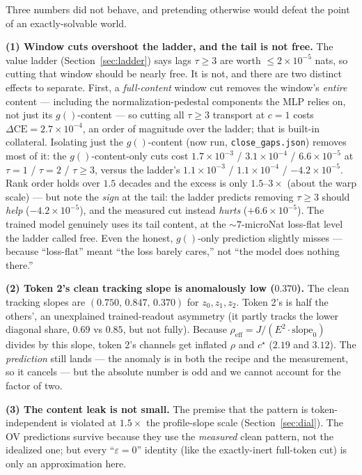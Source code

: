 \documentclass[11pt]{article}
\newcommand{\gv}[1]{g(#1)}
\newcommand{\ceword}{\mathrm{CE}}
\begin{document}
Three numbers did not behave, and pretending otherwise would defeat the point
of an exactly-solvable world.

\textbf{(1) Window cuts overshoot the ladder, and the tail is not free.} The
value ladder (Section~\ref{sec:ladder}) says lags $\tau\ge3$ are worth
$\le2\times10^{-5}$ nats, so cutting that window should be nearly free. It is
not, and there are two distinct effects to separate. First, a
\emph{full-content} window cut removes the window's \emph{entire} content ---
including the normalization-pedestal components the MLP relies on, not just its
$\gv{}$-content --- so cutting all $\tau\ge3$ transport at $c=1$ costs
$\Delta\ceword=2.7\times10^{-4}$, an order of magnitude over the ladder; that is
built-in collateral. Isolating just the $\gv{}$-content (now run,
\texttt{close\_gaps.json}) removes most of it: the $\gv{}$-content-only cuts cost
$1.7\times10^{-3}$ / $3.1\times10^{-4}$ / $6.6\times10^{-5}$ at $\tau=1$ /
$\tau=2$ / $\tau\ge3$, versus the ladder's $1.1\times10^{-3}$ /
$1.1\times10^{-4}$ / $-4.2\times10^{-5}$. Rank order holds over $1.5$ decades and
the excess is only $1.5$--$3\times$ (about the warp scale) --- but note the
\emph{sign} at the tail: the ladder predicts removing $\tau\ge3$ should
\emph{help} ($-4.2\times10^{-5}$), and the measured cut instead \emph{hurts}
($+6.6\times10^{-5}$). The trained model genuinely uses its tail content, at the
$\sim7$-microNat loss-flat level the ladder called free. Even the honest,
$\gv{}$-only prediction slightly misses --- because ``loss-flat'' meant
``the loss barely cares,'' not ``the model does nothing there.''

\textbf{(2) Token 2's clean tracking slope is anomalously low ($0.370$).} The
clean tracking slopes are $(0.750,\,0.847,\,0.370)$ for $z_0,z_1,z_2$. Token
2's is half the others', an unexplained trained-readout asymmetry (it partly
tracks the lower diagonal share, $0.69$ vs $0.85$, but not fully). Because
$\rho_{\mathrm{eff}}=J/(E^2\cdot\text{slope}_0)$ divides by this slope, token
2's channels get inflated $\rho$ and $c^\star$ ($2.19$ and $3.12$). The
\emph{prediction} still lands --- the anomaly is in both the recipe and the
measurement, so it cancels --- but the absolute number is odd and we cannot
account for the factor of two.

\textbf{(3) The content leak is not small.} The premise that the pattern is
token-independent is violated at $1.5\times$ the profile-slope scale
(Section~\ref{sec:dial}). The OV predictions survive because they use the
\emph{measured} clean pattern, not the idealized one; but every ``$\varepsilon=0$''
identity (like the exactly-inert full-token cut) is only an approximation here.
\end{document}
